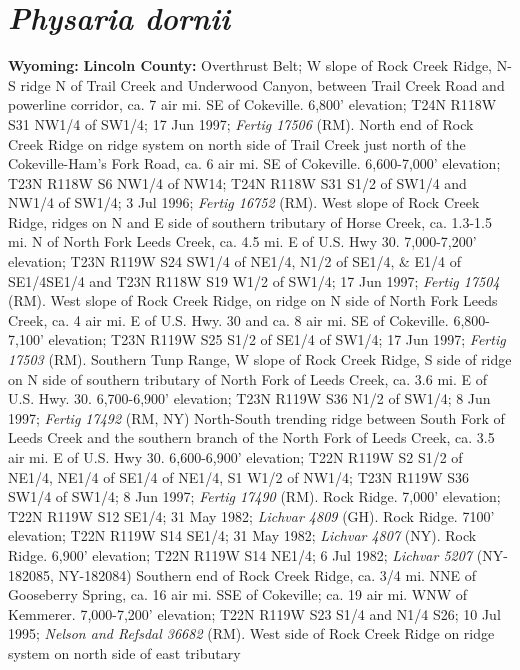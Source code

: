 \section*{\textit{Physaria dornii}}

  \textbf{Wyoming:}
  \textbf{Lincoln County:}
Overthrust Belt; W slope of Rock Creek Ridge, N-S ridge N of Trail Creek and
Underwood Canyon, between Trail Creek Road and powerline corridor, ca. 7 air mi.
SE of Cokeville. 6,800' elevation; T24N R118W S31 NW1/4 of SW1/4; 17 Jun 1997;
\textit{Fertig 17506} (RM).
North end of Rock Creek Ridge on ridge system on north side of
Trail Creek just north of the Cokeville-Ham's Fork Road, ca. 6 air mi. SE of
Cokeville. 6,600-7,000' elevation; T23N R118W S6 NW1/4 of NW14; T24N R118W S31
S1/2 of SW1/4 and NW1/4 of SW1/4; 3 Jul 1996; \textit{Fertig 16752} (RM).
West slope of Rock Creek Ridge, ridges on N and E side of southern tributary of
Horse Creek, ca. 1.3-1.5 mi. N of North Fork Leeds Creek, ca. 4.5 mi. E of U.S.
Hwy 30. 7,000-7,200' elevation; T23N R119W S24 SW1/4 of NE1/4, N1/2 of SE1/4, &
E1/4 of SE1/4SE1/4 and T23N R118W S19 W1/2 of SW1/4; 17 Jun 1997;
\textit{Fertig 17504} (RM).
West slope of Rock Creek Ridge, on ridge on N side of North Fork Leeds Creek,
ca. 4 air mi. E of U.S. Hwy. 30 and ca. 8 air mi. SE of Cokeville.
6,800-7,100' elevation; T23N R119W S25 S1/2 of SE1/4 of SW1/4; 17 Jun 1997;
\textit{Fertig 17503} (RM).
Southern Tunp Range, W slope of Rock Creek Ridge, S side of ridge on N side of
southern tributary of North Fork of Leeds Creek, ca. 3.6 mi. E of U.S. Hwy. 30.
6,700-6,900' elevation; T23N R119W S36 N1/2 of SW1/4; 8 Jun 1997;
\textit{Fertig 17492} (RM, NY)
North-South trending ridge between South Fork of Leeds Creek and the southern
branch of the North Fork of Leeds Creek, ca. 3.5 air mi. E of U.S. Hwy 30.
6,600-6,900' elevation; T22N R119W S2 S1/2 of NE1/4, NE1/4 of SE1/4 of NE1/4,
S1 W1/2 of NW1/4; T23N R119W S36 SW1/4 of SW1/4; 8 Jun 1997;
\textit{Fertig 17490} (RM).
Rock Ridge. 7,000' elevation; T22N R119W S12 SE1/4; 31 May 1982;
\textit{Lichvar 4809} (GH).
Rock Ridge. 7100' elevation; T22N R119W S14 SE1/4; 31 May 1982;
\textit{Lichvar 4807} (NY).
Rock Ridge. 6,900' elevation; T22N R119W S14 NE1/4; 6 Jul 1982;
\textit{Lichvar 5207} (NY-182085, NY-182084)
Southern end of Rock Creek Ridge, ca. 3/4 mi. NNE of Gooseberry Spring,
ca. 16 air mi. SSE of Cokeville; ca. 19 air mi. WNW of Kemmerer.
7,000-7,200' elevation; T22N R119W S23 S1/4 and N1/4 S26; 10 Jul 1995;
\textit{Nelson and Refsdal 36682} (RM).
West side of Rock Creek Ridge on ridge system on north side of east tributary
